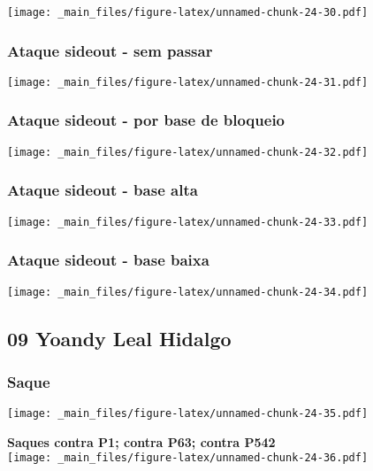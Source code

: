 \documentclass[
]{book}
\begin{document}
\texttt{[image: \_main\_files/figure-latex/unnamed-chunk-24-30.pdf]}

\subsubsection*{Ataque sideout - sem passar}\label{ataque-sideout---sem-passar-1}

\texttt{[image: \_main\_files/figure-latex/unnamed-chunk-24-31.pdf]}

\subsubsection*{Ataque sideout - por base de bloqueio}\label{ataque-sideout---por-base-de-bloqueio-1}

\texttt{[image: \_main\_files/figure-latex/unnamed-chunk-24-32.pdf]}

\subsubsection*{Ataque sideout - base alta}\label{ataque-sideout---base-alta-1}

\texttt{[image: \_main\_files/figure-latex/unnamed-chunk-24-33.pdf]}

\subsubsection*{Ataque sideout - base baixa}\label{ataque-sideout---base-baixa-1}

\texttt{[image: \_main\_files/figure-latex/unnamed-chunk-24-34.pdf]} \newpage

\subsection{09 Yoandy Leal Hidalgo}\label{yoandy-leal-hidalgo}

\subsubsection{Saque}\label{saque-2}

\texttt{[image: \_main\_files/figure-latex/unnamed-chunk-24-35.pdf]}

\textbf{Saques contra P1; contra P63; contra P542}\\
\texttt{[image: \_main\_files/figure-latex/unnamed-chunk-24-36.pdf]}
\end{document}
